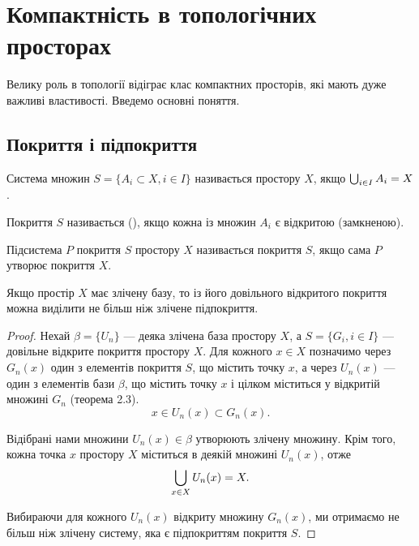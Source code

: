 \chapter{Компактність в топологічних просторах}

Велику роль в топології відіграє клас компактних
просторів, які мають дуже важливі властивості. Введемо
основні поняття.

\section{Покриття і підпокриття}

\begin{definition}
Система множин $S = \{A_i \subset X, i \in I\}$ називається
 простору $X$, якщо $\operatorname*{\bigcup}_{i \in I} A_i = X$.
\end{definition}

\begin{definition}
Покриття $S$ називається 
(), якщо кожна із множин $A_i$ є відкритою
(замкненою).
\end{definition}

\begin{definition}
Підсистема $P$ покриття $S$ простору $X$
називається  покриття $S$, якщо сама $P$
утворює покриття $X$.
\end{definition}

\begin{theorem}
[Ліндельоф] Якщо простір $X$ має злічену
базу, то із його довільного відкритого покриття можна
виділити не більш ніж злічене підпокриття.
\end{theorem}

\begin{proof}
Нехай $\beta = \{U_n\}$ --- деяка злічена база
простору $X$, а $S = \{G_i, i \in I\}$ --- довільне відкрите покриття
простору $X$. Для кожного $x \in X$ позначимо через $G_n(x)$ один
з елементів покриття $S$, що містить точку $x$, а через $U_n(x)$ ---
один з елементів бази $\beta$, що містить точку $x$ і цілком
міститься у відкритій множині $G_n$ (теорема 2.3).
\begin{equation*}
x \in U_n(x) \subset G_n(x).
\end{equation*}

Відібрані нами множини $U_n(x) \in \beta$ утворюють злічену
множину. Крім того, кожна точка $x$ простору $X$ міститься в
деякій множині $U_n(x)$, отже
\begin{equation*}
\operatorname*{\bigcup}_{x \in X} U_n(x) = X.
\end{equation*}

Вибираючи для кожного $U_n(x)$ відкриту множину $G_n(x)$,
ми отримаємо не більш ніж злічену систему, яка є
підпокриттям покриття $S$.
\end{proof}

